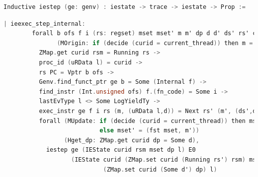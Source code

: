 \begin{lstlisting}[language=C]
  Inductive iestep (ge: genv) : iestate -> trace -> iestate -> Prop :=
\end{lstlisting}


\begin{lstlisting}[language=C]
    | ieexec_step_internal:
        forall b ofs f i (rs: regset) mset mset' m m' dp d d' ds' rs' curid rsm l
               (MOrigin: if (decide (curid = current_thread)) then m = fst mset else m = snd mset),
          ZMap.get curid rsm = Running rs ->
          proc_id (uRData l) = curid ->
          rs PC = Vptr b ofs ->
          Genv.find_funct_ptr ge b = Some (Internal f) ->
          find_instr (Int.unsigned ofs) f.(fn_code) = Some i ->
          lastEvType l <> Some LogYieldTy ->
          exec_instr ge f i rs (m, (uRData l,d)) = Next rs' (m', (ds',d')) ->
          forall (MUpdate: if (decide (curid = current_thread)) then mset' = (m', snd mset)
                           else mset' = (fst mset, m'))
                 (Hget_dp: ZMap.get curid dp = Some d),
            iestep ge (IEState curid rsm mset dp l) E0
                   (IEState curid (ZMap.set curid (Running rs') rsm) mset' 
                            (ZMap.set curid (Some d') dp) l)
\end{lstlisting}


